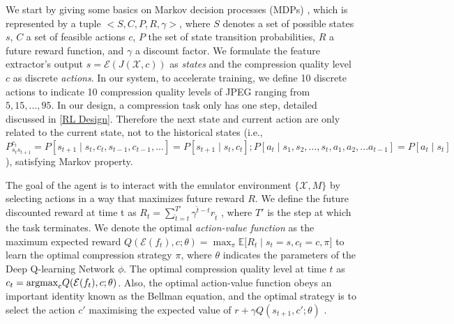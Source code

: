 {\color{revise3} We start by giving some basics on Markov decision processes (MDPs) \cite{MDP}, which is represented by a tuple $<S,C,P,R,\gamma>$, where $S$ denotes a set of possible states $s$, $C$ a set of feasible actions $c$, $P$ the set of state transition probabilities, $R$ a future reward function, and $\gamma$ a discount factor. We formulate the feature extractor's output  $ s = \mathcal{E}(J(\mathcal{X}, c)) $ as \emph{states} and the compression quality level $ c $ as discrete \emph{actions}. In our system, to accelerate training, we define 10 discrete actions to indicate 10 compression quality levels of JPEG ranging from $ 5, 15, ...,95 $. In our design, a compression task only has one step, detailed discussed in \ref{RL Design}. Therefore the next state and current action are only related to the current state, not to the historical states (i.e., $P_{s_{t}s_{t+1}}^{c_{t}} = P [s_{t+1} \mid s_{t}, c_t , s_{t-1}, c_{t-1},... ] = P [s_{t+1} \mid s_{t}, c_t ] ; P [ a_{t} \mid s_{1},s_{2},...,s_{t},a_{1},a_{2},...a_{t-1}] = P [ a_{t} \mid s_{t} ]$ ), satisfying Markov property.} 

%

{\color{revise3} The goal of the agent is to interact with the emulator environment $ \{\mathcal{X}, M\} $ by selecting actions in a way that maximizes future reward $R$. We define the future discounted reward at time t as $R_t = \sum_{\hat{t}=t}^{T'} \gamma^{\hat{t}-t}r_{\hat{t}}$ , where $T'$ is the step at which the task terminates.}{\color{revise3} We denote the optimal \emph{action-value function} as the maximum expected reward $ Q(\mathcal{E}(f_t), c; \theta) = \max_{\pi} \mathbb{E} \big[R_t \mid s_t=s,c_t=c,\pi\big]$ to learn the optimal compression strategy $\pi$, where $ \theta $ indicates the parameters of the Deep Q-learning Network $ \phi $. The optimal compression quality level at time $ t $ as $  c_t = {\rm argmax}_cQ(\mathcal{E}(f_t), c; \theta) $. Also, the optimal action-value function obeys an important identity known as the Bellman equation, and the optimal strategy is to select the action $c'$ maximising the expected value of $r + \gamma Q(s_{t+1}, c'; \theta) $ \cite{DQN}.}

	
